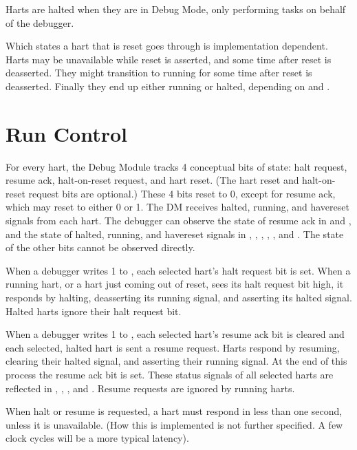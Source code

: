 Harts are halted when they are in Debug Mode, only performing tasks on behalf
of the debugger.

Which states a hart that is reset goes through is implementation dependent.
Harts may be unavailable while reset is asserted, and some time after reset is
deasserted. They might transition to running for some time after reset is
deasserted. Finally they end up either running or halted, depending on
\FdmDmcontrolHaltreq and \Fresethaltreq.

\section{Run Control} \label{runcontrol}

For every hart, the Debug Module tracks 4 conceptual bits of state: halt
request, resume ack, halt-on-reset request,  and hart reset.
(The hart reset and halt-on-reset request bits are optional.)
These 4 bits reset to 0, except for resume ack, which may reset to either 0 or 1.
The DM receives halted, running, and havereset signals from each hart.
The debugger can observe the state of resume ack in \FdmDmstatusAllresumeack and
\FdmDmstatusAnyresumeack, and the state of halted, running, and havereset signals
in \FdmDmstatusAllhalted, \FdmDmstatusAnyhalted, \FdmDmstatusAllrunning, \FdmDmstatusAnyrunning, \FdmDmstatusAllhavereset,
and \FdmDmstatusAnyhavereset. The state of the other bits cannot be observed directly.

When a debugger writes 1 to \FdmDmcontrolHaltreq, each selected hart's halt request bit is
set.
When a running hart, or a hart just coming out of reset, sees its halt request
bit high, it responds by halting, deasserting its running signal, and asserting
its halted signal.
Halted harts ignore their halt request bit.

When a debugger writes 1 to \FdmDmcontrolResumereq, each selected hart's resume ack bit is
cleared and each selected, halted hart is sent a resume request. Harts respond
by resuming, clearing their halted signal, and asserting their running signal.
At the end of this process the resume ack bit is set.  These
status signals of all selected harts are reflected in \FdmDmstatusAllresumeack,
\FdmDmstatusAnyresumeack, \FdmDmstatusAllrunning, and \FdmDmstatusAnyrunning. Resume requests are ignored by
running harts.

When halt or resume is requested, a hart must respond in
less than one second, unless it is unavailable.
(How this is implemented is not further specified. A few
clock cycles will be a more typical latency).

